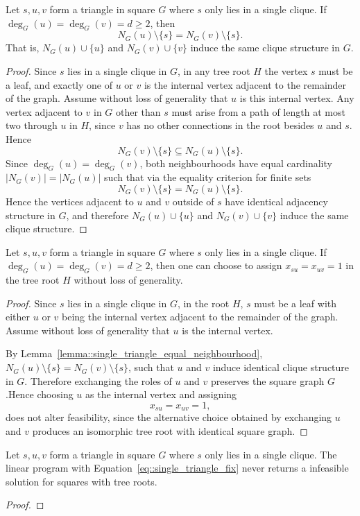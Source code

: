 
\begin{lemma} \label{lemma::single_triangle_equal_neighbourhood}
  Let $s,u,v$ form a triangle in square $G$ where $s$ only lies in a single clique. If $\deg_G(u)=\deg_G(v)=d\geq 2$, then
  \[
  N_G(u)\setminus\{s\}=N_G(v)\setminus\{s\}.
  \]
  That is, $N_G(u)\cup\{u\}$ and $N_G(v)\cup\{v\}$ induce the same clique structure in $G$.
\end{lemma}
\begin{proof}
  Since $s$ lies in a single clique in $G$, in any tree root $H$ the vertex $s$ must be a leaf, and exactly one of $u$ or $v$ is the internal vertex adjacent to the remainder of the graph. Assume without loss of generality that $u$ is this internal vertex. Any vertex adjacent to $v$ in $G$ other than $s$ must arise from a path of length at most two through $u$ in $H$, since $v$ has no other connections in the root besides $u$ and $s$. Hence
  \[
  N_G(v)\setminus\{s\}\subseteq N_G(u)\setminus\{s\}.
  \]
  Since $\deg_G(u)=\deg_G(v)$, both neighbourhoods have equal cardinality $|N_G(v)| = |N_G(u)|$ such that via the equality criterion for finite sets
  \[
  N_G(v)\setminus\{s\}
  =
  N_G(u)\setminus\{s\}.
  \]
  Hence the vertices adjacent to $u$ and $v$ outside of $s$ have identical adjacency structure in $G$, and therefore $N_G(u)\cup\{u\}$ and $N_G(v)\cup\{v\}$ induce the same clique structure.
\end{proof}

\begin{proposition} \label{prop::single_triangular_decomposition_equality}
  Let $s,u,v$ form a triangle in square $G$ where $s$ only lies in a single clique. If $\deg_G(u)=\deg_G(v)=d\geq2$, then one can choose to assign $x_{su}=x_{uv}=1$ in the tree root $H$ without loss of generality.
\end{proposition}
\begin{proof}
  Since $s$ lies in a single clique in $G$, in the root $H$, $s$ must be a leaf with either $u$ or $v$ being the internal vertex adjacent to the remainder of the graph. Assume without loss of generality that $u$ is the internal vertex.

  By Lemma~\ref{lemma::single_triangle_equal_neighbourhood}, $N_G(u)\setminus\{s\}=N_G(v)\setminus\{s\}$, such that $u$ and $v$ induce identical clique structure in $G$. Therefore exchanging the roles of $u$ and $v$ preserves the square graph $G$.Hence choosing $u$ as the internal vertex and assigning
  \[
  x_{su}=x_{uv}=1,
  \]
  does not alter feasibility, since the alternative choice obtained by exchanging $u$ and $v$ produces an isomorphic tree root with identical square graph.
\end{proof}

\begin{proposition} \label{prop::single_triangular_decomposition_feasibility}
  Let $s,u,v$ form a triangle in square $G$ where $s$ only lies in a single clique. The linear program with Equation~\eqref{eq::single_triangle_fix} never returns a infeasible solution for squares with tree roots. 
\end{proposition}
\begin{proof}
\end{proof}